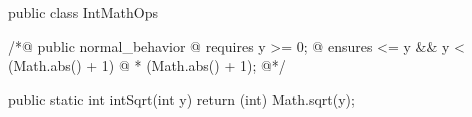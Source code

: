 public class IntMathOps { 

  /*@ public normal_behavior 
    @ requires y >= 0; 
    @ ensures \result * \result <= y && y < (Math.abs(\result) + 1)
    @ * (Math.abs(\result) + 1); 
    @*/ 

  public static int intSqrt(int y) 
  { 
    return (int) Math.sqrt(y); 
  } 
} 
 